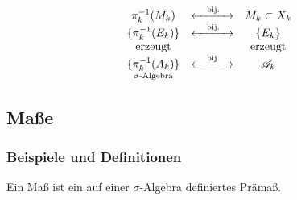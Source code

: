 \begin{equation*}
	\begin{array}{ccc}
		\pi_k^{-1}(M_k) & \xleftrightarrow{\quad\text{bij.}\quad} & M_k \subset X_k \\
		\{ \pi^{-1}_k(E_k) \} & \xleftrightarrow{\quad\text{bij.}\quad} & \{E_k\} \\
		\text{erzeugt} & &\text{erzeugt} \\
		\underset{\sigma\text{-Algebra}}{\{\pi_k^{-1}(A_k)\}} & \xleftrightarrow{\quad\text{bij.}\quad}  & \AA_k
	\end{array}
\end{equation*}
\subsection{Maße}
\subsubsection{Beispiele und Definitionen}
\begin{definition}
\begin{mdframed}
Ein Maß ist ein auf einer $\sigma$-Algebra definiertes Prämaß.
\end{mdframed}
\end{definition}

